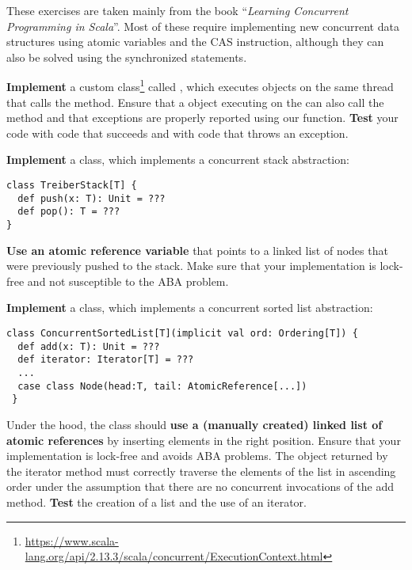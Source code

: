 \documentclass[11pt]{article}
\begin{document}
\myHeader

These exercises are taken mainly from the book ``\emph{Learning Concurrent Programming in Scala}''.
%
Most of these require implementing new concurrent data structures using atomic variables and the CAS instruction, although they can also be solved using the synchronized statements.


\begin{myExercise}
\textbf{Implement} a custom  class\footnote{\url{https://www.scala-lang.org/api/2.13.3/scala/concurrent/ExecutionContext.html}} called , which executes  objects on the same thread that calls the  method. Ensure that a  object executing on the  can also call the  method and that exceptions are properly reported using our  function. \textbf{Test} your code with code that succeeds and with code that throws an exception.
\end{myExercise}

\begin{myExercise}
\textbf{Implement} a  class, which implements a concurrent stack abstraction:
\begin{lstlisting}
class TreiberStack[T] {
  def push(x: T): Unit = ???
  def pop(): T = ???
}
\end{lstlisting}
\textbf{Use an atomic reference variable} that points to a linked list of nodes that were previously pushed to the stack. Make sure that your implementation is lock-free and not susceptible to the ABA problem.
\end{myExercise}

\begin{myExercise}
\textbf{Implement} a  class, which implements a concurrent sorted list abstraction:
\begin{lstlisting}
class ConcurrentSortedList[T](implicit val ord: Ordering[T]) {
  def add(x: T): Unit = ???
  def iterator: Iterator[T] = ???
  ...
  case class Node(head:T, tail: AtomicReference[...])
 }
\end{lstlisting}
Under the hood, the  class should \textbf{use a (manually created) linked list of atomic references} by inserting elements in the right position. Ensure that your implementation is lock-free and avoids ABA problems.
The  object returned by the iterator method must correctly traverse the elements of the list in ascending order under the assumption that there are no concurrent invocations of the add method.
\textbf{Test} the creation of a list and the use of an iterator.
\end{myExercise}
\end{document}
